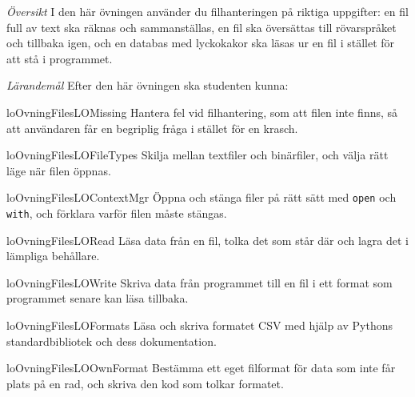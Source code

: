 \emph{Översikt}
I den här övningen använder du filhanteringen på riktiga uppgifter:
en fil full av text ska räknas och sammanställas, en fil ska översättas
till rövarspråket och tillbaka igen, och en databas med lyckokakor ska
läsas ur en fil i stället för att stå i programmet.

\emph{Lärandemål}
Efter den här övningen ska studenten kunna:
\begin{restatable}{lo}{OvningFilesLOMissing}\label{OvningFilesLOMissing}%
  Hantera fel vid filhantering, som att filen inte finns, så att
  användaren får en begriplig fråga i stället för en krasch.
\end{restatable}
\begin{restatable}{lo}{OvningFilesLOFileTypes}%
  \label{OvningFilesLOFileTypes}%
  Skilja mellan textfiler och binärfiler, och välja rätt läge när filen
  öppnas.
\end{restatable}
\begin{restatable}{lo}{OvningFilesLOContextMgr}%
  \label{OvningFilesLOContextMgr}%
  Öppna och stänga filer på rätt sätt med \texttt{open} och
  \texttt{with}, och förklara varför filen måste stängas.
\end{restatable}
\begin{restatable}{lo}{OvningFilesLORead}\label{OvningFilesLORead}%
  Läsa data från en fil, tolka det som står där och lagra det i lämpliga
  behållare.
\end{restatable}
\begin{restatable}{lo}{OvningFilesLOWrite}\label{OvningFilesLOWrite}%
  Skriva data från programmet till en fil i ett format som programmet
  senare kan läsa tillbaka.
\end{restatable}
\begin{restatable}{lo}{OvningFilesLOFormats}\label{OvningFilesLOFormats}%
  Läsa och skriva formatet CSV med hjälp av Pythons standardbibliotek och
  dess dokumentation.
\end{restatable}
\begin{restatable}{lo}{OvningFilesLOOwnFormat}%
  \label{OvningFilesLOOwnFormat}%
  Bestämma ett eget filformat för data som inte får plats på en rad, och
  skriva den kod som tolkar formatet.
\end{restatable}


